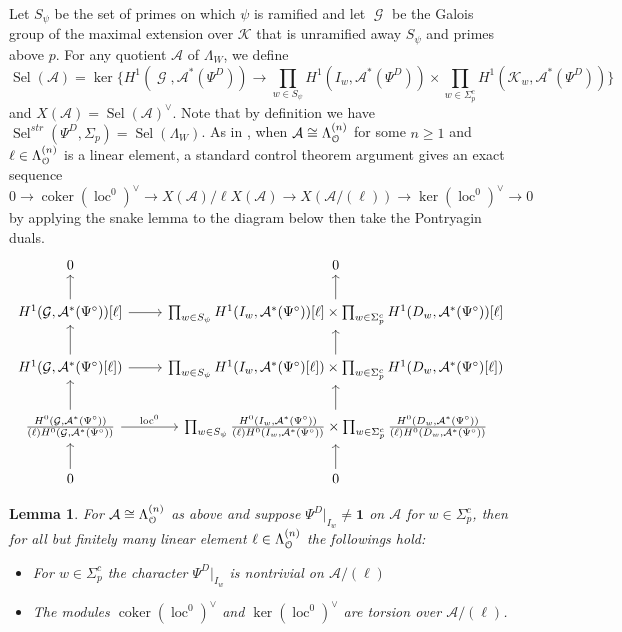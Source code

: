 \documentclass[leqno]{amsart}
\newtheorem{lem}[thm]{Lemma}
\theoremstyle{definition}
\theoremstyle{remark}
\newcommand{\id}{\mathbf{1}}
\newcommand{\eo}{\EuScript{O}}
\DeclareMathOperator{\coker}{coker}
\DeclareMathOperator{\Gal}{\mathcal{G}}
\newcommand{\K}{{\mathcal{K}}} %
\DeclareMathOperator{\loc}{loc}
\DeclareMathOperator{\Sel}{Sel}
\newcommand{\Lda}[1]{\Lambda^{(#1)}}
\begin{document}
Let $S_\psi$ be the set of primes on which $\psi$ is ramified
and let $\Gal$ be the Galois group of the maximal extension
over $\K$ that is unramified away $S_\psi$ and primes above $p$.
For any quotient $\mathcal{A}$ of $\Lambda_W$, we define 
\begin{equation}
    \Sel(\mathcal{A})=
    \ker\big\{
    H^1(\Gal, \mathcal{A}^*(\Psi^D))\to
    \prod_{w\in S_\psi}
    H^1(I_w,\mathcal{A}^*(\Psi^D))\times 
    \prod_{w\in \Sigma_p^c}
    H^1(\K_w,\mathcal{A}^*(\Psi^D))
    \big\}
\end{equation}
and $X(\mathcal{A})=\Sel(\mathcal{A})^\vee$.
Note that by definition we have
$\Sel^{str}(\Psi^D,\Sigma_p)=\Sel(\Lambda_W)$.
As in \cite[Prop 2.6]{Hsieh2010},
when $\mathcal{A}\cong \Lda{n}_{\eo}$ for some $n\geq 1$
and $\ell\in\Lda{n}_{\eo}$ is a linear element,
a standard control theorem argument gives an exact sequence
$0\to \coker(\loc^0)^\vee\to X(\mathcal{A})/\ell X(\mathcal{A})
\to X(\mathcal{A}/(\ell))\to \ker(\loc^0)^\vee\to 0$
by applying the snake lemma to the diagram below
then take the Pontryagin duals.
\[
\begin{tikzcd}
0 & 0\\
H^1(\Gal,\mathcal{A}^*(\Psi^\circ))[\ell] \arrow[u]\arrow[r] &
\prod_{w\in S_\psi}
H^1(I_w,\mathcal{A}^*(\Psi^\circ))[\ell]\times
\prod_{w\in\Sigma_p^c}
H^1(D_w,\mathcal{A}^*(\Psi^\circ))[\ell] \arrow[u]\\
H^1(\Gal,\mathcal{A}^*(\Psi^\circ)[\ell]) \arrow[u]\arrow[r] &
\prod_{w\in S_\psi}
H^1(I_w,\mathcal{A}^*(\Psi^\circ)[\ell])\times
\prod_{w\in\Sigma_p^c}
H^1(D_w,\mathcal{A}^*(\Psi^\circ)[\ell]) \arrow[u]\\
\frac{H^0(\Gal,\mathcal{A}^*(\Psi^\circ))}
{(\ell)H^0(\Gal,\mathcal{A}^*(\Psi^\circ))}
\arrow[u]\arrow[r,"\loc^0"] &
\prod_{w\in S_\psi}
\frac{H^0(I_w,\mathcal{A}^*(\Psi^\circ))}
{(\ell)H^0(I_w,\mathcal{A}^*(\Psi^\circ))}\times
\prod_{w\in\Sigma_p^c}
\frac{H^0(D_w,\mathcal{A}^*(\Psi^\circ))}
{(\ell)H^0(D_w,\mathcal{A}^*(\Psi^\circ))} \arrow[u]\\
0\arrow[u] & 
0\arrow[u]
\end{tikzcd}
\]

\begin{lem}
For $\mathcal{A}\cong \Lda{n}_{\eo}$ as above
and suppose $\Psi^D\vert_{I_w}\neq \id$ on $\mathcal{A}$
for $w\in\Sigma_p^c$,  then
for all but finitely many linear element $\ell\in\Lda{n}_{\eo}$
the followings hold:
\begin{itemize}
\item 
For $w\in\Sigma_p^c$
the character $\Psi^D\vert_{I_w}$ is nontrivial on $\mathcal{A}/(\ell)$
\item 
The modules $\coker(\loc^0)^\vee$ and $\ker(\loc^0)^\vee$
are torsion over $\mathcal{A}/(\ell)$.
\end{itemize}
\end{lem}
\end{document}
